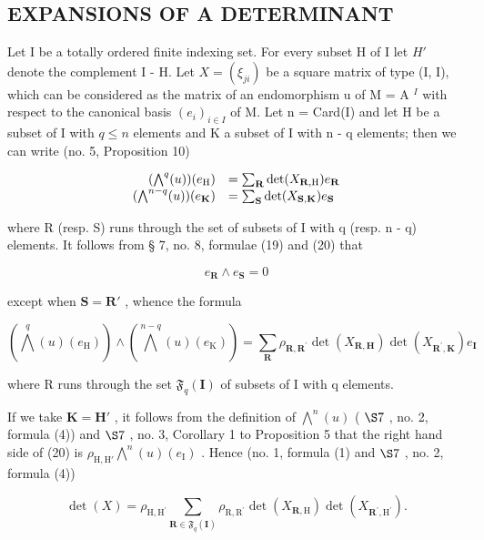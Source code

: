 \subsection{EXPANSIONS OF A DETERMINANT}

Let I be a totally ordered finite indexing set. For every subset H of I let \(H'\) denote the complement I - H. Let \(X = (\xi_{ji})\) be a square matrix of type (I, I), which can be considered as the matrix of an endomorphism u of M = A \(^{I}\) with respect to the canonical basis \((e_{i})_{i \in I}\) of M. Let n = Card(I) and let H be a subset of I with \(q \leqslant n\) elements and K a subset of I with n - q elements; then we can write (no. 5, Proposition 10)

\[
\begin{array}{r l} (\bigwedge^ {q} (u)) (e _ {\mathrm{H}}) & = \sum_ {\mathbf {R}} \det (X _ {\mathbf {R}, \mathrm{H}}) e _ {\mathbf {R}} \\ (\bigwedge^ {n - q} (u)) (e _ {\mathbf {K}}) & = \sum_ {\mathbf {S}} \det (X _ {\mathbf {S}, \mathbf {K}}) e _ {\mathbf {S}} \end{array}
\]

where R (resp. S) runs through the set of subsets of I with q (resp. n - q) elements. It follows from § 7, no. 8, formulae (19) and (20) that

\[
e _ {\mathbf {R}} \wedge e _ {\mathbf {S}} = 0
\]

except when \(\mathbf{S} = \mathbf{R}'\) , whence the formula

\[
\left(\bigwedge^ {q} (u) \left(e _ {\mathrm{H}}\right)\right) \wedge \left(\bigwedge^ {n - q} (u) \left(e _ {\mathrm{K}}\right)\right) = \sum_ {\mathbf {R}} \rho_ {\mathbf {R}, \mathbf {R} ^ {\prime}} \det \left(X _ {\mathbf {R}, \mathbf {H}}\right) \det \left(X _ {\mathbf {R} ^ {\prime}, \mathbf {K}}\right) e _ {\mathbf {I}}\tag{20}
\]

where R runs through the set \(\mathfrak{F}_{q}(\mathbf{I})\) of subsets of I with q elements.

If we take \(\mathbf{K} = \mathbf{H}'\) , it follows from the definition of \(\bigwedge^{n}(u)\) ( \(\S 7\) , no. 2, formula (4)) and \(\S 7\) , no. 3, Corollary 1 to Proposition 5 that the right hand side of (20) is \(\rho_{\mathrm{H},\mathrm{H}'}\bigwedge^{n}(u)(e_{\mathrm{I}})\) . Hence (no. 1, formula (1) and \(\S 7\) , no. 2, formula (4))

\[
\det (X) = \rho_ {\mathrm{H}, \mathrm{H} ^ {\prime}} \sum_ {\mathbf {R} \in \mathfrak {F} _ {q} (\mathbf {I})} \rho_ {\mathrm{R}, \mathrm{R} ^ {\prime}} \det (X _ {\mathbf {R}, \mathrm{H}}) \det (X _ {\mathbf {R} ^ {\prime}, \mathrm{H} ^ {\prime}}).\tag{21}
\]

